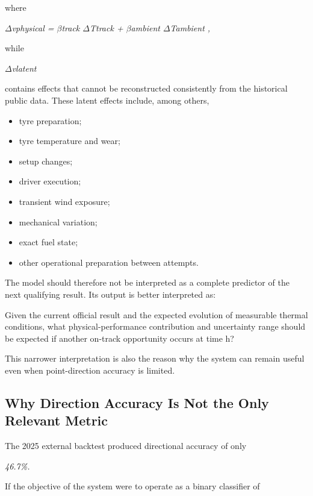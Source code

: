 where

\begin{center}\textit{\ensuremath{\Delta}vphysical = \ensuremath{\beta}track \ensuremath{\Delta}Ttrack + \ensuremath{\beta}ambient \ensuremath{\Delta}Tambient ,}\end{center}

while

\begin{center}\textit{\ensuremath{\Delta}vlatent}\end{center}

contains effects that cannot be reconstructed consistently from the historical public data. These latent effects include, among others,

\begin{itemize}
\item tyre preparation;
\item tyre temperature and wear;
\item setup changes;
\item driver execution;
\item transient wind exposure;
\item mechanical variation;
\item exact fuel state;
\item other operational preparation between attempts.
\end{itemize}

The model should therefore not be interpreted as a complete predictor of the next qualifying result. Its output is better interpreted as:

Given the current official result and the expected evolution of measurable thermal conditions, what physical-performance contribution and uncertainty range should be expected if another on-track opportunity occurs at time h?

This narrower interpretation is also the reason why the system can remain useful even when point-direction accuracy is limited.

\subsection{Why Direction Accuracy Is Not the Only Relevant Metric}
The 2025 external backtest produced directional accuracy of only

\begin{center}\textit{46.7\%.}\end{center}

If the objective of the system were to operate as a binary classifier of

